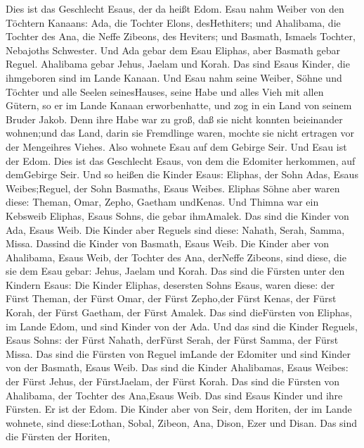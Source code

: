  Dies ist das Geschlecht Esaus, der da heißt Edom.
 Esau nahm Weiber von den Töchtern Kanaans: Ada, die Tochter
Elons, desHethiters; und Ahalibama, die Tochter des Ana, die Neffe
Zibeons, des Heviters;  und Basmath, Ismaels Tochter,
Nebajoths Schwester.  Und Ada gebar dem Esau Eliphas, aber
Basmath gebar Reguel.  Ahalibama gebar Jehus, Jaelam und
Korah. Das sind Esaus Kinder, die ihmgeboren sind im Lande Kanaan.
 Und Esau nahm seine Weiber, Söhne und Töchter und alle
Seelen seinesHauses, seine Habe und alles Vieh mit allen Gütern, so er
im Lande Kanaan erworbenhatte, und zog in ein Land von seinem Bruder
Jakob.  Denn ihre Habe war zu groß, daß sie nicht konnten
beieinander wohnen;und das Land, darin sie Fremdlinge waren, mochte sie
nicht ertragen vor der Mengeihres Viehes.  Also wohnete Esau
auf dem Gebirge Seir. Und Esau ist der Edom.  Dies ist das
Geschlecht Esaus, von dem die Edomiter herkommen, auf demGebirge Seir.
 Und so heißen die Kinder Esaus: Eliphas, der Sohn Adas,
Esaus Weibes;Reguel, der Sohn Basmaths, Esaus Weibes. 
Eliphas Söhne aber waren diese: Theman, Omar, Zepho, Gaetham undKenas.
 Und Thimna war ein Kebsweib Eliphas, Esaus Sohns, die
gebar ihmAmalek. Das sind die Kinder von Ada, Esaus Weib. 
Die Kinder aber Reguels sind diese: Nahath, Serah, Samma, Missa. Dassind
die Kinder von Basmath, Esaus Weib.  Die Kinder aber von
Ahalibama, Esaus Weib, der Tochter des Ana, derNeffe Zibeons, sind
diese, die sie dem Esau gebar: Jehus, Jaelam und Korah. 
Das sind die Fürsten unter den Kindern Esaus: Die Kinder Eliphas,
desersten Sohns Esaus, waren diese: der Fürst Theman, der Fürst Omar,
der Fürst Zepho,der Fürst Kenas,  der Fürst Korah, der
Fürst Gaetham, der Fürst Amalek. Das sind dieFürsten von Eliphas, im
Lande Edom, und sind Kinder von der Ada.  Und das sind die
Kinder Reguels, Esaus Sohns: der Fürst Nahath, derFürst Serah, der Fürst
Samma, der Fürst Missa. Das sind die Fürsten von Reguel imLande der
Edomiter und sind Kinder von der Basmath, Esaus Weib.  Das
sind die Kinder Ahalibamas, Esaus Weibes: der Fürst Jehus, der
FürstJaelam, der Fürst Korah. Das sind die Fürsten von Ahalibama, der
Tochter des Ana,Esaus Weib.  Das sind Esaus Kinder und ihre
Fürsten. Er ist der Edom.  Die Kinder aber von Seir, dem
Horiten, der im Lande wohnete, sind diese:Lothan, Sobal, Zibeon, Ana,
Dison, Ezer und Disan.  Das sind die Fürsten der Horiten,
